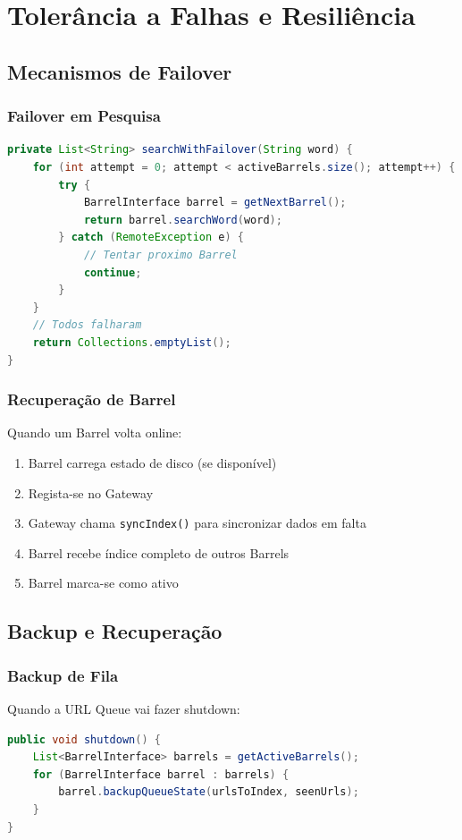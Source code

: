 \documentclass[12pt,a4paper]{article}
\begin{document}
\section{Tolerância a Falhas e Resiliência}

\subsection{Mecanismos de Failover}

\subsubsection{Failover em Pesquisa}
\begin{lstlisting}[language=Java, caption={Retry automático}]
private List<String> searchWithFailover(String word) {
    for (int attempt = 0; attempt < activeBarrels.size(); attempt++) {
        try {
            BarrelInterface barrel = getNextBarrel();
            return barrel.searchWord(word);
        } catch (RemoteException e) {
            // Tentar proximo Barrel
            continue;
        }
    }
    // Todos falharam
    return Collections.emptyList();
}
\end{lstlisting}

\subsubsection{Recuperação de Barrel}
Quando um Barrel volta online:
\begin{enumerate}
    \item Barrel carrega estado de disco (se disponível)
    \item Regista-se no Gateway
    \item Gateway chama \texttt{syncIndex()} para sincronizar dados em falta
    \item Barrel recebe índice completo de outros Barrels
    \item Barrel marca-se como ativo
\end{enumerate}

\subsection{Backup e Recuperação}

\subsubsection{Backup de Fila}
Quando a URL Queue vai fazer shutdown:
\begin{lstlisting}[language=Java, caption={Backup para Barrels}]
public void shutdown() {
    List<BarrelInterface> barrels = getActiveBarrels();
    for (BarrelInterface barrel : barrels) {
        barrel.backupQueueState(urlsToIndex, seenUrls);
    }
}
\end{lstlisting}
\end{document}
